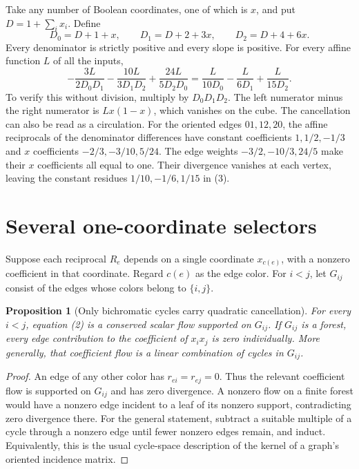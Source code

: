 \documentclass[11pt]{article}
\newtheorem{proposition}[theorem]{Proposition}
\begin{document}
Take any number of Boolean coordinates, one of which is $x$, and put
$D=1+\sum_i x_i$. Define
\[
 D_0=D+1+x,\qquad D_1=D+2+3x,\qquad D_2=D+4+6x.
\]
Every denominator is strictly positive and every slope is positive.
For every affine function $L$ of all the inputs,
\[
 -\frac{3L}{2D_0D_1}-\frac{10L}{3D_1D_2}
 +\frac{24L}{5D_2D_0}
 =\frac{L}{10D_0}-\frac{L}{6D_1}+\frac{L}{15D_2}.
 \tag{3}
\]
To verify this without division, multiply by $D_0D_1D_2$. The left
numerator minus the right numerator is $Lx(1-x)$, which vanishes
on the cube. The cancellation can also be read as a circulation.
For the oriented edges $01,12,20$, the affine reciprocals of the
denominator differences have constant coefficients
$1,1/2,-1/3$ and $x$ coefficients $-2/3,-3/10,5/24$.
The edge weights $-3/2,-10/3,24/5$ make their $x$ coefficients all
equal to one. Their divergence vanishes at each vertex, leaving the
constant residues $1/10,-1/6,1/15$ in (3).

\section{Several one-coordinate selectors}

Suppose each reciprocal $R_e$ depends on a single coordinate
$x_{c(e)}$, with a nonzero coefficient in that coordinate. Regard
$c(e)$ as the edge color. For $i<j$, let $G_{ij}$ consist of the edges
whose colors belong to $\{i,j\}$.

\begin{proposition}[Only bichromatic cycles carry quadratic cancellation]
For every $i<j$, equation (2) is a conserved scalar flow supported
on $G_{ij}$. If $G_{ij}$ is a forest, every edge contribution to the
coefficient of $x_i x_j$ is zero individually. More generally, that
coefficient flow is a linear combination of cycles in $G_{ij}$.
\end{proposition}
\begin{proof}
An edge of any other color has $r_{ei}=r_{ej}=0$. Thus the relevant
coefficient flow is supported on $G_{ij}$ and has zero divergence.
A nonzero flow on a finite forest would have a nonzero edge incident
to a leaf of its nonzero support, contradicting zero divergence there.
For the general statement, subtract a suitable multiple of a cycle
through a nonzero edge until fewer nonzero edges remain, and induct.
Equivalently, this is the usual cycle-space description of the kernel
of a graph's oriented incidence matrix.
\end{proof}
\end{document}
